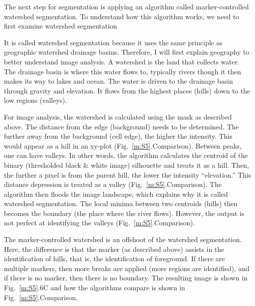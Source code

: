 The next step for segmentation is applying an algorithm called marker-controlled watershed segmentation. To understand how this algorithm works, we need to first examine watershed segmentation

It is called watershed segmentation because it uses the same principle as geographic watershed drainage basins. Therefore, I will first explain geography to better understand image analysis. A watershed is the land that collects water. The drainage basin is where this water flows to, typically rivers though it then makes its way to lakes and ocean. The water is driven to the drainage basin through gravity and elevation. It flows from the highest places (hills) down to the low regions (valleys).

For image analysis, the watershed is calculated using the mask as described above. The distance from the edge (background) needs to be determined. The further away from the background (cell edge), the higher the intensity. This would appear as a hill in an xy-plot (Fig.~\ref{m:S5}.Comparison). Between peaks, one can have valleys. In other words, the algorithm calculates the centroid of the binary (thresholded black \& white image) silhouette and treats it as a hill. Then, the further a pixel is from the parent hill, the lower the intensity “elevation.” This distance depression is treated as a valley (Fig.~\ref{m:S5}.Comparison). The algorithm then floods the image landscape, which explains why it is called watershed segmentation. The local minima between two centroids (hills) then becomes the boundary (the place where the river flows). However, the output is not perfect at identifying the valleys (Fig.~\ref{m:S5}.Comparison).

The marker-controlled watershed is an offshoot of the watershed segmentation. Here, the difference is that the marker (as described above) assists in the identification of hills, that is, the identification of foreground. If there are multiple markers, then more breaks are applied (more regions are identified), and if there is no marker, then there is no boundary. The resulting image is shown in Fig.~\ref{m:S5}.6C and how the algorithms compare is shown in Fig.~\ref{m:S5}.Comparison.


